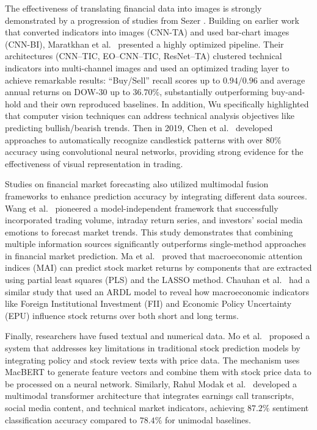 \documentclass[12pt,a4paper]{article}
\begin{document}
The effectiveness of translating financial data into images is strongly demonstrated by a progression of studies from Sezer \cite{sezer2018algorithmic}. Building on earlier work that converted indicators into images (CNN-TA) and used bar-chart images (CNN-BI), Maratkhan et al.\ \cite{maratkhan2021deep} presented a highly optimized pipeline. Their architectures (CNN--TIC, EO--CNN--TIC, ResNet--TA) clustered technical indicators into multi-channel images and used an optimized trading layer to achieve remarkable results: ``Buy/Sell'' recall scores up to $0.94/0.96$ and average annual returns on DOW-30 up to $36.70\%$, substantially outperforming buy-and-hold and their own reproduced baselines. In addition, Wu \cite{wu2021empowering} specifically highlighted that computer vision techniques can address technical analysis objectives like predicting bullish/bearish trends. Then in 2019, Chen et al.\ \cite{chen2020encoding} developed approaches to automatically recognize candlestick patterns with over $80\%$ accuracy using convolutional neural networks, providing strong evidence for the effectiveness of visual representation in trading.

Studies on financial market forecasting also utilized multimodal fusion frameworks to enhance prediction accuracy by integrating different data sources. Wang et al.\ \cite{wang2019aggregating} pioneered a model-independent framework that successfully incorporated trading volume, intraday return series, and investors’ social media emotions to forecast market trends. This study demonstrates that combining multiple information sources significantly outperforms single-method approaches in financial market prediction. Ma et al.\ \cite{ma2022macroeconomic} proved that macroeconomic attention indices (MAI) can predict stock market returns by components that are extracted using partial least squares (PLS) and the LASSO method. Chauhan et al.\ \cite{chauhan2025exploring} had a similar study that used an ARDL model to reveal how macroeconomic indicators like Foreign Institutional Investment (FII) and Economic Policy Uncertainty (EPU) influence stock returns over both short and long terms.

Finally, researchers have fused textual and numerical data. Mo et al.\ \cite{mo2024mof} proposed a system that addresses key limitations in traditional stock prediction models by integrating policy and stock review texts with price data. The mechanism uses MacBERT to generate feature vectors and combine them with stock price data to be processed on a neural network. Similarly, Rahul Modak et al.\ \cite{Modak2023MarketSA} developed a multimodal transformer architecture that integrates earnings call transcripts, social media content, and technical market indicators, achieving $87.2\%$ sentiment classification accuracy compared to $78.4\%$ for unimodal baselines.
\end{document}
